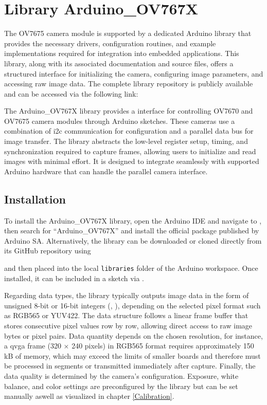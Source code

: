 \chapter{Library Arduino\_OV767X} \label{ArduinoOV767X}
The OV7675 camera module is supported by a dedicated Arduino library that provides the necessary drivers, configuration routines, and example implementations required for integration into embedded applications. This library, along with its associated documentation and source files, offers a structured interface for initializing the camera, configuring image parameters, and accessing raw image data. The complete library repository is publicly available and can be accessed via the following link:

The Arduino\_OV767X library provides a interface for controlling OV7670 and OV7675 camera modules through Arduino sketches. These cameras use a combination of \ac{i2c} communication for configuration and a parallel data bus for image transfer. The library abstracts the low-level register setup, timing, and synchronization required to capture frames, allowing users to initialize and read images with minimal effort. It is designed to integrate seamlessly with supported Arduino hardware that can handle the parallel camera interface.

\section{Installation}

To install the Arduino\_OV767X library, open the Arduino IDE and navigate to , then search for “Arduino\_OV767X” and install the official package published by Arduino SA. Alternatively, the library can be downloaded or cloned directly from its GitHub repository using

and then placed into the local \texttt{libraries} folder of the Arduino workspace. 
Once installed, it can be included in a sketch via .



Regarding data types, the library typically outputs image data in the form of unsigned 8-bit or 16-bit integers (, ), depending on the selected pixel format such as RGB565 or YUV422. The data structure follows a linear frame buffer that stores consecutive pixel values row by row, allowing direct access to raw image bytes or pixel pairs. Data quantity depends on the chosen resolution, for instance, a \ac{qvga} frame (320 $\times$ 240 pixels) in RGB565 format requires approximately 150 kB of memory, which may exceed the limits of smaller boards and therefore must be processed in segments or transmitted immediately after capture. Finally, the data quality is determined by the camera’s configuration. Exposure, white balance, and color settings are preconfigured by the library but can be set manually aswell as visualized in chapter \ref{Calibration}.


